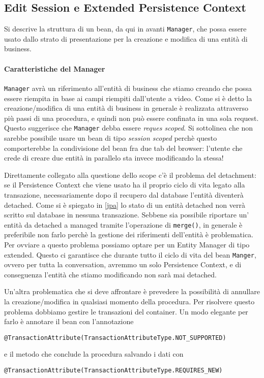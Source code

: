 \subsection{Edit Session e Extended Persistence Context}
Si descrive la struttura di un bean, da qui in avanti \texttt{Manager}, che possa essere usato dallo strato di presentazione per la creazione e modifica di una entità di business.

\paragraph{Caratteristiche del Manager}
\texttt{Manager} avrà un riferimento all'entità di business che stiamo creando che possa essere riempita in base ai campi riempiti dall'utente a video.
Come si è detto la creazione/modifica di una entità di business in generale è realizzata attraverso più passi di una procedura, e quindi non può essere confinata in una sola request. Questo suggerisce che \texttt{Manager} debba essere 
\textsl{reques scoped}. Si sottolinea che non sarebbe possibile usare un bean di tipo \textsl{session scoped} perchè questo comporterebbe la condivisione del bean fra due tab del browser: l'utente che crede di creare due entità in parallelo
sta invece modificando la stessa!

Direttamente collegato alla questione dello scope c'è il problema del detachment: se il Persistence Context che viene usato ha il proprio ciclo di vita legato alla transazione, necessariamente dopo il recupero dal database l'entità diventerà
detached. Come si è spiegato in \ref{jpa} lo stato di un entità detached non verrà scritto sul database in nessuna transazione. Sebbene sia possibile riportare un' entità da detached a managed tramite
l'operazione di \texttt{merge()}, in generale è preferibile non farlo perchè la gestione dei riferimenti dell'entità è problematica. Per ovviare a questo problema possiamo optare per un Entity Manager di tipo extended. Questo ci garantisce
che durante tutto il ciclo di vita del bean \texttt{Manger}, ovvero per tutta la conversation, avremmo un solo Persistence Context, e di conseguenza l'entità che stiamo modificando non sarà mai detached.

Un'altra problematica che si deve affrontare è prevedere la possibilità di annullare la creazione/modifica in qualsiasi momento della procedura. Per risolvere questo problema dobbiamo gestire le transazioni del container.
Un modo elegante per farlo è annotare il bean con l'annotazione 
\begin{lstlisting} 
@TransactionAttribute(TransactionAttributeType.NOT_SUPPORTED)
\end{lstlisting}
e il metodo che conclude la procedura salvando i dati con 
\begin{lstlisting}
@TransactionAttribute(TransactionAttributeType.REQUIRES_NEW)
\end{lstlisting}



